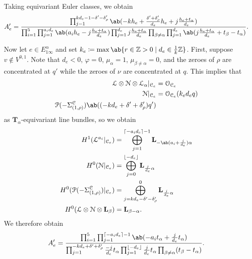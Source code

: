 \documentclass{amsart}
\DeclarePairedDelimiter{\floor}{\lfloor}{\rfloor}
\DeclarePairedDelimiter{\ceil}{\lceil}{\rceil}
\theoremstyle{definition}
\theoremstyle{remark}
\theoremstyle{plain}
\theoremstyle{definition}
\theoremstyle{remark}
\newcommand{\Z}{\mathbb{Z}}
\newcommand{\T}{\mathbf{T}}
\newcommand{\mc}[1]{\mathcal{#1}}
\newcommand{\mbf}[1]{\mathbf{#1}}
\newcommand{\1}{\mathbf{1}}
\newcommand{\2}{\mathbf{2}}
\newcommand{\3}{\mathbf{3}}
\begin{document}
Taking equivariant Euler classes, we obtain
\[ A'_e = \frac{\prod_{j=1}^{kd_e-1-\delta'-\delta'_{\rho}} \ab(-k h_e +\frac{\delta'+\delta'_{\rho}}{d_e} h_e + j \frac{h_e + t_{\alpha}}{d_e})}{\prod_{i=1}^5 \prod_{j=1}^{a_i d_e} \ab(a_i h_e - j\frac{h_e + t_{\alpha}}{d_e}) \prod_{j=1}^{d_e} j\frac{h_e+t_{\alpha}}{d_e} \prod_{\beta \neq \alpha} \prod_{j=1}^{d_e} \ab(j\frac{h_e + t_{\alpha}}{d_e} + t_{\beta} - t_{\alpha})}. \]

Now let $e \in E_{1\infty}^{\alpha}$ and set $k_e \coloneqq \max\ab\{ r \in \Z>0 \mid d_e \in \frac{1}{k}\Z \}$. First, suppose $v \notin V^{0,1}$. Note that $d_e < 0$, $\varphi = 0$, $\mu_{\alpha} = 1$, $\mu_{\beta \neq \alpha} = 0$, and the zeroes of $\rho$ are concentrated at $q'$ while the zeroes of $\nu$ are concentrated at $q$. This implies that
\begin{align*}
    \mc{L} \otimes \mc{N} \otimes \mc{L}_{\alpha}|_{\mc{C}_e} &= \mc{O}_{\mc{C}_e} \\
    \mc{N}|_{\mc{C}_e} &= \mc{O}_{\mc{C}_e}(k_e d_e q) \\
    \mc{P}(-\Sigma_{(1,\rho)}^{\mc{C}}) \ab((-kd_e + \delta' + \delta'_{\rho})q')
\end{align*}
as $\T_{\alpha}$-equivariant line bundles, so we obtain
\begin{align*}
    H^1(\mc{L}^{a_i}|_{\mc{C}_e}) &= \bigoplus_{j=1}^{\ceil{-a_i d_e}-1} \mbf{L}_{-\ab(a_i + \frac{j}{d_e})\alpha} \\
    H^0(\mc{N}|_{\mc{C}_e}) &= \bigoplus_{j=0}^{\floor{- d_e}} \mbf{L}_{\frac{j}{d_e} \alpha} \\
    H^0(\mc{P}(-\Sigma_{(1,\rho)}^{\mc{C}})|_{\mc{C}_e}) &= \bigoplus_{j=k d_e - \delta' - \delta'_{\rho}}^0 \mbf{L}_{\frac{j}{d_e}\alpha} \\
    H^0(\mc{L}\otimes \mc{N}\otimes \mbf{L}_{\beta}) &= \mbf{L}_{\beta-\alpha}.
\end{align*}
We therefore obtain
\[ A'_e = \frac{\prod_{i=1}^5 \prod_{j=1}^{\ceil{-a_i d_e}-1} \ab(-a_i t_{\alpha} + \frac{j}{d_e}t_{\alpha})}{\prod_{j=1}^{-k d_e + \delta' + \delta'_{\rho}} \frac{-j}{d_e} t_{\alpha} \prod_{j=1}^{\floor{-d_e}} \frac{j}{d_e}t_{\alpha} \prod_{\beta \neq \alpha} (t_{\beta}-t_{\alpha})}. \]
\end{document}
